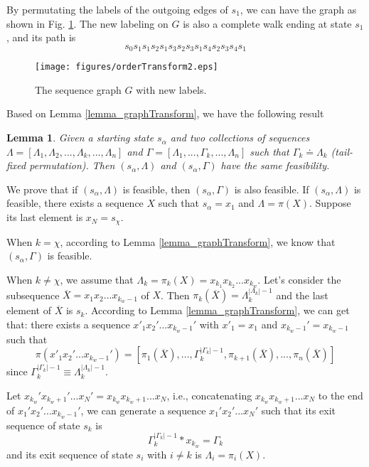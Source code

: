\documentclass[journal]{IEEEtran}
\newtheorem{Lemma}[Theorem]{Lemma}
\def\tmu{\doteq}
\def\pmu{\equiv}
\begin{document}
By permutating the labels of the outgoing edges of $s_1$, we can have the graph as shown in Fig. \ref{fig_orderTransform2}.  The new labeling on $G$ is also a complete walk ending at state
$s_1$, and its path is $$s_0s_1s_1s_2s_1s_3s_2s_3s_1s_4s_2s_3s_4s_1$$

\begin{figure}[!h]
\centering
\texttt{[image: figures/orderTransform2.eps]}
\caption{The sequence graph $G$ with new labels.}
\label{fig_orderTransform2}
\end{figure}

Based on Lemma \ref{lemma_graphTransform}, we have the following result
\begin{Lemma}Given a starting state $s_\alpha$ and two collections of sequences $\Lambda=[\Lambda_1,\Lambda_2,...,\Lambda_k,...,\Lambda_n]$ and $\Gamma=[\Lambda_1,...,\Gamma_k,...,\Lambda_n]$
such that $\Gamma_k\tmu \Lambda_k$ (tail-fixed permutation). Then $(s_\alpha, \Lambda)$ and $(s_\alpha, \Gamma)$ have the same feasibility. \label{lemma_graphTransform2}
\end{Lemma}

\proof We prove that if $(s_\alpha, \Lambda)$ is feasible, then $(s_\alpha, \Gamma)$ is also feasible. If $(s_\alpha, \Lambda)$ is feasible,  there exists a sequence $X$ such that $s_\alpha=x_1$ and $\Lambda=\pi(X)$. Suppose its last element is $x_N=s_\chi$.

When $k=\chi$, according to Lemma \ref{lemma_graphTransform}, we know that $(s_\alpha, \Gamma)$ is feasible.

When $k\neq \chi$, we assume that $\Lambda_k=\pi_k(X)=x_{k_1}x_{k_2}...x_{k_w}$. Let's consider the subsequence $\overline{X}=x_1x_2...x_{k_w-1}$ of $X$. Then $\pi_k(\overline{X})=\Lambda_k^{|\Lambda_k|-1}$ and the last element of $\overline{X}$ is $s_k$. According to Lemma \ref{lemma_graphTransform}, we can get that:
there exists a sequence  $x'_1x_2'...x_{k_w-1}'$ with $x'_1=x_1$ and $x_{k_w-1}'=x_{k_w-1}$ such that
$$\pi(x'_1x_2'...x_{k_w-1}')=[\pi_1(\overline{X}),...,\Gamma_k^{|\Gamma_k|-1},\pi_{k+1}(\overline{X}),...,\pi_n(\overline{X})]$$
since
$\Gamma_k^{|\Gamma_k|-1}\pmu \Lambda_k^{|\Lambda_k|-1}$.

Let $x_{k_w}'x_{k_w+1}'...x_{N}'=x_{k_w}x_{k_w+1}...x_{N}$, i.e., concatenating $x_{k_w}x_{k_w+1}...x_{N}$ to the end of $x_1'x_2'...x_{k_w-1}'$, we
can generate a sequence $x_1'x_2'...x_N'$ such that its exit sequence of state $s_k$ is
$$\Gamma_k^{|\Gamma_k|-1}*x_{k_w}=\Gamma_k$$
and its exit sequence of state $s_i$ with $i\neq k$ is $\Lambda_i=\pi_i(X)$.
\end{document}
